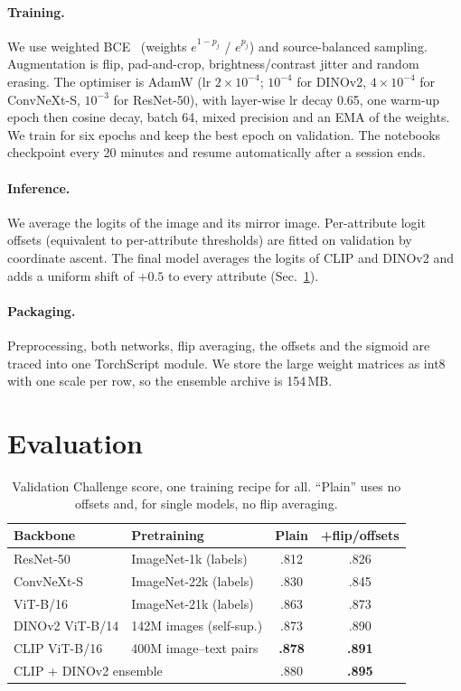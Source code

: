 \documentclass[10pt,twocolumn,letterpaper]{article}
\begin{document}
\paragraph{Training.} We use weighted BCE~\cite{li2015deepmar} (weights $e^{1-p_j}$ / $e^{p_j}$) and source-balanced sampling. Augmentation is flip, pad-and-crop, brightness/contrast jitter and random erasing. The optimiser is AdamW (lr $2{\times}10^{-4}$; $10^{-4}$ for DINOv2, $4{\times}10^{-4}$ for ConvNeXt-S, $10^{-3}$ for ResNet-50), with layer-wise lr decay 0.65, one warm-up epoch then cosine decay, batch 64, mixed precision and an EMA of the weights. We train for six epochs and keep the best epoch on validation. The notebooks checkpoint every 20 minutes and resume automatically after a session ends.

\paragraph{Inference.} We average the logits of the image and its mirror image. Per-attribute logit offsets (equivalent to per-attribute thresholds) are fitted on validation by coordinate ascent. The final model averages the logits of CLIP and DINOv2 and adds a uniform shift of $+0.5$ to every attribute (Sec.~\ref{sec:eval}).

\paragraph{Packaging.} Preprocessing, both networks, flip averaging, the offsets and the sigmoid are traced into one TorchScript module. We store the large weight matrices as int8 with one scale per row, so the ensemble archive is 154\,MB.

\section{Evaluation}
\label{sec:eval}

\begin{table}[t]
\centering
\small
\setlength{\tabcolsep}{4pt}
\begin{tabular}{llcc}
\toprule
Backbone & Pretraining & Plain & +flip/offsets \\
\midrule
ResNet-50 & ImageNet-1k (labels) & .812 & .826 \\
ConvNeXt-S & ImageNet-22k (labels) & .830 & .845 \\
ViT-B/16 & ImageNet-21k (labels) & .863 & .873 \\
DINOv2 ViT-B/14 & 142M images (self-sup.) & .873 & .890 \\
CLIP ViT-B/16 & 400M image--text pairs & \textbf{.878} & \textbf{.891} \\
\midrule
\multicolumn{2}{l}{CLIP + DINOv2 ensemble} & .880 & \textbf{.895} \\
\bottomrule
\end{tabular}
\caption{Validation Challenge score, one training recipe for all. ``Plain'' uses no offsets and, for single models, no flip averaging.}
\label{tab:val}
\end{table}
\end{document}
